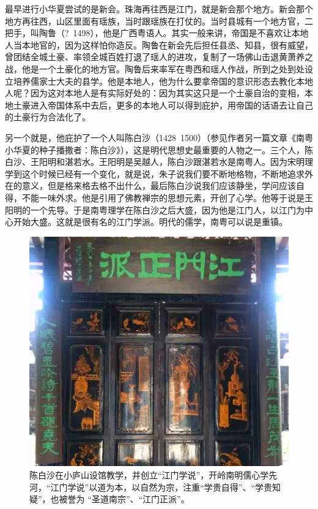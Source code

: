 最早进行小华夏尝试的是新会。珠海再往西是江门，就是新会那个地方。新会那个地方再往西，山区里面有瑶族，当时跟瑶族在打仗的。当时县城有一个地方官，二把手，叫陶鲁（?~1498），他是广西粤语人。其实一般来讲，帝国是不喜欢让本地人当本地官的，因为这样怕你造反。陶鲁在新会先后担任县丞、知县，很有威望，曾团结全城土豪、率领全城百姓打退了瑶人的进攻，复制了一场佛山击退黄萧养之战，他是一个土豪化的地方官。陶鲁后来率军在粤西和瑶人作战，所到之处到处设立培养儒家士大夫的县学。他是本地人，他为什么要拿帝国的意识形态去教化本地人呢？因为这对本地人是有实际好处的：因为其实这只是一个土豪自治的变相，本地土豪进入帝国体系中去后，更多的本地人可以得到庇护，用帝国的话语去让自己的土豪行为合法化了。

另一个就是，他庇护了一个人叫陈白沙（1428~1500）（参见作者另一篇文章《南粤小华夏的种子播撒者：陈白沙》），这是明代思想史最重要的人物之一。三个人，陈白沙、王阳明和湛若水。王阳明是吴越人，陈白沙跟湛若水是南粤人。因为宋明理学到这个时候已经有一个变化，就是说，朱子说我们要不断地格物，不断地追求外在的意义，但是格来格去格不出什么，最后陈白沙说我们应该静坐，学问应该自得，不能一味外求。他是引用了佛教禅宗的思想元素，开创了心学。他等于说是王阳明的一个先导。于是南粤理学在陈白沙之后大盛，因为他是江门人，以江门为中心开始大盛。这就是很有名的江门学派。明代的儒学，南粤可以说是重镇。

\begin{figure}
	\centering
	\includegraphics[width=\textwidth]{images/image-52}
	\caption{陈白沙在小庐山设馆教学，并创立“江门学说”，开岭南明儒心学先河，“江门学说”以道为本，以自然为宗，注重“学贵自得”、“学贵知疑”，也被誉为 “圣道南宗”、“江门正派”。}
\end{figure}

